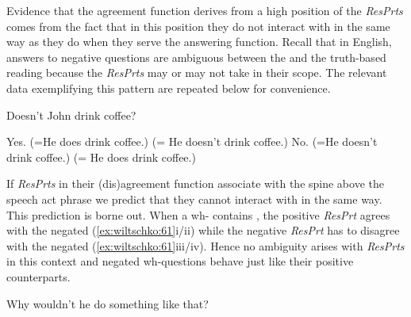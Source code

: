 \documentclass[output=paper]{LSP/langsci}
\begin{document}
Evidence that the agreement function derives from a high position of the \textit{ResPrts} comes from the fact that in this position they do not interact with  in the same way as they do when they serve the answering function. Recall that in English, answers to negative questions are ambiguous between the  and the truth-based reading because the \textit{ResPrts} may or may not take  in their scope.
The relevant data exemplifying this pattern are repeated below for convenience.



\ea\label{ex:wiltschko:60}\settowidth{}
\begin{xlist}
  Doesn’t John drink coffee?
 \begin{xlisti}
  \ex Yes. (=He does drink coffee.)
  \exi{}  (= He doesn’t drink coffee.)
  \ex No. (=He doesn’t drink coffee.)
  \exi{}  (= He does drink coffee.)
 \end{xlisti}\end{xlist}
\z

If \textit{ResPrts} in their (dis)agreement function associate with the spine above the speech act phrase we predict that they cannot interact with  in the same way. This prediction is borne out. When a wh- contains , the positive \textit{ResPrt} agrees with the negated  (\ref{ex:wiltschko:61}i/ii) while the negative \textit{ResPrt} has to disagree with the negated  (\ref{ex:wiltschko:61}iii/iv). Hence no ambiguity arises with \textit{ResPrts} in this context and negated wh-questions behave just like their positive counterparts. 


\ea\label{ex:wiltschko:61}
\begin{xlist}
  Why wouldn’t he do something like that?
 \begin{xlisti}
 \end{xlisti}
 \end{xlist}
\z
    
\end{document}
